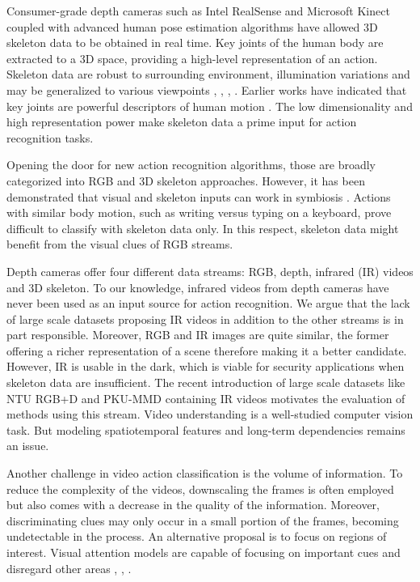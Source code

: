 \documentclass[letterpaper, 10 pt, conference]{ieeeconf}
\begin{document}
Consumer-grade depth cameras such as Intel RealSense \cite{keselman2017intel} and Microsoft Kinect \cite{zhang2012microsoft} coupled with advanced human pose estimation algorithms \cite{shotton2011real} have allowed 3D skeleton data to be obtained in real time. Key joints of the human body are extracted to a 3D space, providing a high-level representation of an action. Skeleton data are robust to surrounding  environment, illumination variations and may be generalized to various viewpoints \cite{aggarwal2014human}, \cite{han2017space}, \cite{presti20163d}, \cite{wang2018rgb}. Earlier works have indicated that key joints are powerful descriptors of human motion \cite{johansson1973visual}. The low dimensionality and high representation power make skeleton data a prime input for action recognition tasks. 

Opening the door for new action recognition algorithms, those are broadly categorized into RGB and 3D skeleton approaches. However, it has been demonstrated that visual and skeleton inputs can work in symbiosis \cite{rahmani2017learning}. Actions with similar body motion, such as writing versus typing on a keyboard, prove difficult to classify with skeleton data only. In this respect, skeleton data might benefit from the visual clues of RGB streams.

Depth cameras offer four different data streams: RGB, depth, infrared (IR) videos and 3D skeleton. To our knowledge, infrared videos from depth cameras have never been used as an input source for action recognition. We argue that the lack of large scale datasets proposing IR videos in addition to the other streams is in part responsible. Moreover, RGB and IR images are quite similar, the former offering a richer representation of a scene therefore making it a better candidate. However, IR is usable in the dark, which is viable for security applications when skeleton data are insufficient. The recent introduction of large scale datasets like NTU RGB+D \cite{shahroudy2016ntu} and PKU-MMD \cite{liu2017pku} containing IR videos motivates the evaluation of methods using this stream. Video understanding is a well-studied computer vision task. But modeling spatiotemporal features and long-term dependencies remains an issue. 
 
Another challenge in video action classification is the volume of information. To reduce the complexity of the videos, downscaling the frames is often employed but also comes with a decrease in the quality of the information. Moreover, discriminating clues may only occur in a small portion of the frames, becoming undetectable in the process. An alternative proposal is to focus on regions of interest. Visual attention models are capable of focusing on important cues and disregard other areas \cite{cho2015describing}, \cite{mnih2014recurrent}, \cite{sharma2015action}. 
\end{document}
